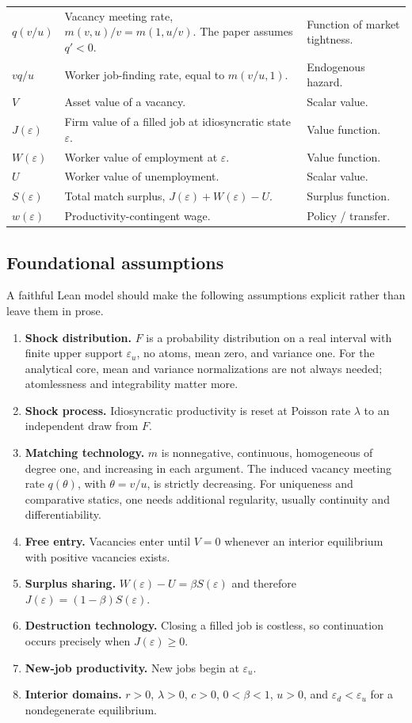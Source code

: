 \documentclass[11pt]{article}
\newcommand{\epsd}{\varepsilon_d}
\newcommand{\epsu}{\varepsilon_u}
\begin{document}
\begin{longtable}{>{\raggedright\arraybackslash}p{} >{\raggedright\arraybackslash}p{} >{\raggedright\arraybackslash}p{}}
$q(v/u)$ & Vacancy meeting rate, $m(v,u)/v=m(1,u/v)$. The paper assumes $q'<0$. & Function of market tightness. \\
$vq/u$ & Worker job-finding rate, equal to $m(v/u,1)$. & Endogenous hazard. \\
$V$ & Asset value of a vacancy. & Scalar value. \\
$J(\varepsilon)$ & Firm value of a filled job at idiosyncratic state $\varepsilon$. & Value function. \\
$W(\varepsilon)$ & Worker value of employment at $\varepsilon$. & Value function. \\
$U$ & Worker value of unemployment. & Scalar value. \\
$S(\varepsilon)$ & Total match surplus, $J(\varepsilon)+W(\varepsilon)-U$. & Surplus function. \\
$w(\varepsilon)$ & Productivity-contingent wage. & Policy / transfer. \\
\bottomrule
\end{longtable}

\subsection{Foundational assumptions}
A faithful Lean model should make the following assumptions explicit rather than leave them in prose.

\begin{enumerate}
\item \textbf{Shock distribution.} $F$ is a probability distribution on a real interval with finite upper support $\epsu$, no atoms, mean zero, and variance one. For the analytical core, mean and variance normalizations are not always needed; atomlessness and integrability matter more.
\item \textbf{Shock process.} Idiosyncratic productivity is reset at Poisson rate $\lambda$ to an independent draw from $F$.
\item \textbf{Matching technology.} $m$ is nonnegative, continuous, homogeneous of degree one, and increasing in each argument. The induced vacancy meeting rate $q(\theta)$, with $\theta=v/u$, is strictly decreasing. For uniqueness and comparative statics, one needs additional regularity, usually continuity and differentiability.
\item \textbf{Free entry.} Vacancies enter until $V=0$ whenever an interior equilibrium with positive vacancies exists.
\item \textbf{Surplus sharing.} $W(\varepsilon)-U=\beta S(\varepsilon)$ and therefore $J(\varepsilon)=(1-\beta)S(\varepsilon)$.
\item \textbf{Destruction technology.} Closing a filled job is costless, so continuation occurs precisely when $J(\varepsilon)\ge 0$.
\item \textbf{New-job productivity.} New jobs begin at $\epsu$.
\item \textbf{Interior domains.} $r>0$, $\lambda>0$, $c>0$, $0<\beta<1$, $u>0$, and $\epsd<\epsu$ for a nondegenerate equilibrium.
\end{enumerate}
\end{document}
